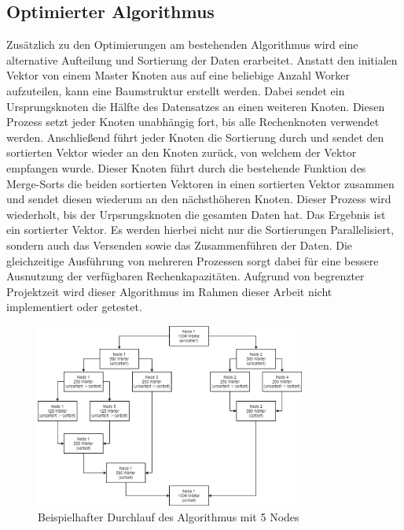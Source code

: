 \subsection{Optimierter Algorithmus}
Zusätzlich zu den Optimierungen am bestehenden Algorithmus wird eine alternative Aufteilung und Sortierung der Daten erarbeitet. Anstatt den initialen Vektor von einem Master Knoten aus auf eine beliebige Anzahl Worker aufzuteilen, kann eine Baumstruktur erstellt werden. Dabei sendet ein Ursprungsknoten die Hälfte des Datensatzes an einen weiteren Knoten. Diesen Prozess setzt jeder Knoten unabhängig fort, bis alle Rechenknoten verwendet werden. Anschließend führt jeder Knoten die Sortierung durch und sendet den sortierten Vektor wieder an den Knoten zurück, von welchem der Vektor empfangen wurde. Dieser Knoten führt durch die bestehende Funktion des Merge-Sorts die beiden sortierten Vektoren in einen sortierten Vektor zusammen und sendet diesen wiederum an den nächsthöheren Knoten. Dieser Prozess wird wiederholt, bis der Urpsrungsknoten die gesamten Daten hat. Das Ergebnis ist ein sortierter Vektor. Es werden hierbei nicht nur die Sortierungen Parallelisiert, sondern auch das Versenden sowie das Zusammenführen der Daten. Die gleichzeitige Ausführung von mehreren Prozessen sorgt dabei für eine bessere Ausnutzung der verfügbaren Rechenkapazitäten. Aufgrund von begrenzter Projektzeit wird dieser Algorithmus im Rahmen dieser Arbeit nicht implementiert oder getestet.
\begin{figure}[!t]
	\centering
	\includegraphics[width=3.5in]{Parallelisierungs_Algorithmus_2.png}
	\caption{Beispielhafter Durchlauf des Algorithmus mit 5 Nodes}
	\label{para_algo2}
\end{figure}